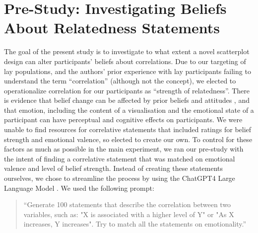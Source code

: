 \documentclass[sigconf]{acmart}
\begin{document}
\section{Pre-Study: Investigating Beliefs About Relatedness
Statements}\label{sec-pre-study}

The goal of the present study is to investigate to what extent a novel
scatterplot design can alter participants' beliefs about correlations.
Due to our targeting of lay populations, and the authors' prior
experience with lay participants failing to understand the term
``correlation'' (although not the concept), we elected to operationalize
correlation for our participants as ``strength of relatedness''. There
is evidence that belief change can be affected by prior beliefs and
attitudes \citep{xiong_2022, markant_2023}, and that emotion, including
the content of a visualisation \citep{phelps_2006, harrison_2013} and
the emotional state of a participant \citep{thoresen_2016} can have
perceptual and cognitive effects on participants. We were unable to find
resources for correlative statements that included ratings for belief
strength and emotional valence, so elected to create our own. To control
for these factors as much as possible in the main experiment, we ran our
pre-study with the intent of finding a correlative statement that was
matched on emotional valence and level of belief strength. Instead of
creating these statements ourselves, we chose to streamline the process
by using the ChatGPT4 Large Language Model \citep{chat_gpt}. We used the
following prompt:

\begin{quotation}
    ``Generate 100 statements that describe the correlation between two variables, such as:
     "X is associated with a higher level of Y" or
     "As X increases, Y increases".
    Try to match all the statements on emotionality.''
    
\end{quotation}
\end{document}
